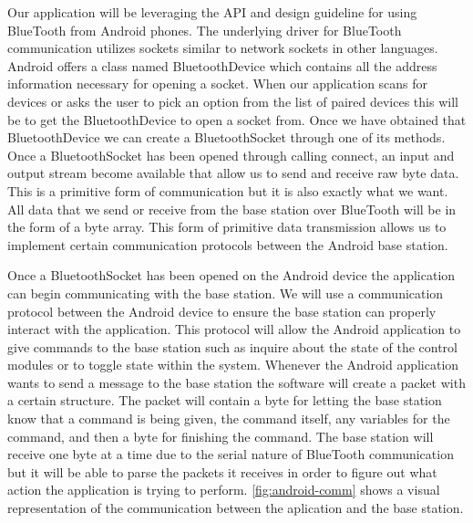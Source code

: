 Our application will be leveraging the API and design guideline for using
BlueTooth from Android phones. The underlying driver for BlueTooth
communication utilizes sockets similar to network sockets in other languages.
Android offers a class named BluetoothDevice which contains all the address
information necessary for opening a socket. When our application scans for
devices or asks the user to pick an option from the list of paired devices this
will be to get the BluetoothDevice to open a socket from. Once we have obtained
that BluetoothDevice we can create a BluetoothSocket through one of its
methods. Once a BluetoothSocket has been opened through calling connect, an
input and output stream become available that allow us to send and receive raw
byte data. This is a primitive form of communication but it is also exactly
what we want. All data that we send or receive from the base station over
BlueTooth will be in the form of a byte array. This form of primitive data
transmission allows us to implement certain communication protocols between the
Android base station.

Once a BluetoothSocket has been opened on the Android device the application
can begin communicating with the base station. We will use a communication
protocol between the Android device to ensure the base station can properly
interact with the application. This protocol will allow the Android application
to give commands to the base station such as inquire about the state of the
control modules or to toggle state within the system. Whenever the Android
application wants to send a message to the base station the software will
create a packet with a certain structure. The packet will contain a byte for
letting the base station know that a command is being given, the command
itself, any variables for the command, and then a byte for finishing the
command. The base station will receive one byte at a time due to the serial
nature of BlueTooth communication but it will be able to parse the packets it
receives in order to figure out what action the application is trying to
perform. \autoref{fig:android-comm} shows a visual representation of the
communication between the aplication and the base station.


